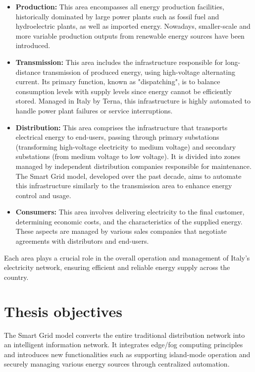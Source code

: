 \begin{itemize}
\item \textbf{Production:} This area encompasses all energy production facilities, historically dominated by large power plants such as fossil fuel and hydroelectric plants, as well as imported energy. Nowadays, smaller-scale and more variable production outputs from renewable energy sources have been introduced.
\item \textbf{Transmission:} This area includes the infrastructure responsible for long-distance transmission of produced energy, using high-voltage alternating current. Its primary function, known as "dispatching"\cite{i1-1}, is to balance consumption levels with supply levels since energy cannot be efficiently stored. Managed in Italy by Terna\cite{i1-2}, this infrastructure is highly automated to handle power plant failures or service interruptions.
\item \textbf{Distribution:} This area comprises the infrastructure that transports electrical energy to end-users, passing through primary substations (transforming high-voltage electricity to medium voltage) and secondary substations (from medium voltage to low voltage). It is divided into zones managed by independent distribution companies responsible for maintenance. The Smart Grid model, developed over the past decade, aims to automate this infrastructure similarly to the transmission area to enhance energy control and usage.
\item \textbf{Consumers:} This area involves delivering electricity to the final customer, determining economic costs, and the characteristics of the supplied energy. These aspects are managed by various sales companies that negotiate agreements with distributors and end-users.
\end{itemize}


Each area plays a crucial role in the overall operation and management of Italy's electricity network, ensuring efficient and reliable energy supply across the country.

\section{Thesis objectives}
The Smart Grid model converts the entire traditional distribution network into an intelligent information network. It integrates edge/fog computing principles and introduces new functionalities such as supporting island-mode operation and securely managing various energy sources through centralized automation.

